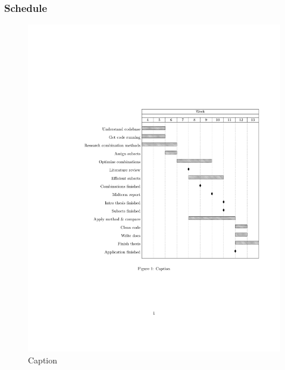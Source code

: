 \documentclass[10pt, compress]{beamer}
\begin{document}
\begin{frame}
    \frametitle{Schedule}
    \begin{figure}
        \centering
        \includegraphics[width=\textwidth]{ScriptieOpdrachten.pdf}
        \caption{Caption}
        \label{fig:my_label}
    \end{figure}
\end{frame}

\end{document}
